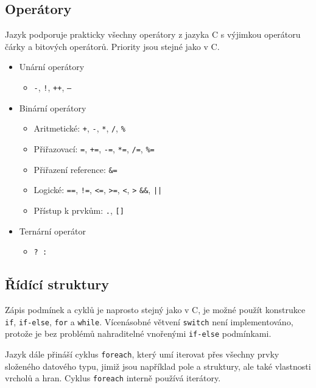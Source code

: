 \documentclass[11pt,twoside,a4paper]{book}
\begin{document}
\subsection{Operátory}

Jazyk podporuje prakticky všechny operátory z jazyka C s výjimkou operátoru čárky a bitových operátorů. Priority jsou stejné jako v C.

\begin{itemize}
\item Unární operátory
	\begin{itemize}
	\item \texttt{-}, \texttt{!}, \texttt{++}, \texttt{--}
	\end{itemize}
\item Binární operátory
	\begin{itemize}
	\item Aritmetické: \texttt{+}, \texttt{-}, \texttt{*}, \texttt{/}, \texttt{\%}
	\item Přiřazovací: \texttt{=}, \texttt{+=}, \texttt{-=}, \texttt{*=}, \texttt{/=}, \texttt{\%=}
	\item Přiřazení reference: \texttt{\&=}
	\item Logické: \texttt{==}, \texttt{!=}, \texttt{<=}, \texttt{>=}, \texttt{<}, \texttt{>} \texttt{\&\&}, \texttt{||}
	\item Přístup k prvkům: \texttt{.}, \texttt{[]}
	\end{itemize}
\item Ternární operátor
	\begin{itemize}
	\item \texttt{? :}
	\end{itemize}
\end{itemize}


\subsection{Řídící struktury}

Zápis podmínek a cyklů je naprosto stejný jako v C, je možné použít konstrukce \texttt{if}, \texttt{if-else}, \texttt{for} a \texttt{while}. Vícenásobné větvení \texttt{switch} není implementováno, protože je bez problémů nahraditelné vnořenými \texttt{if-else} podmínkami.

Jazyk dále přináší cyklus \texttt{foreach}, který umí iterovat přes všechny prvky složeného datového typu, jimiž jsou například pole a struktury, ale také vlastnosti vrcholů a hran. Cyklus \texttt{foreach} interně používá iterátory.
\end{document}
